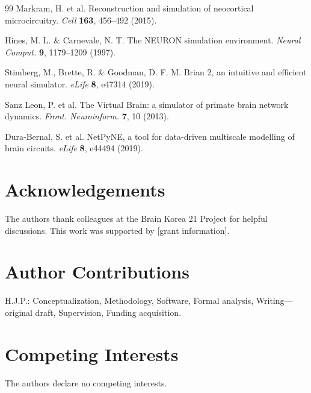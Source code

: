 \documentclass[12pt,a4paper]{article}
\begin{document}
\begin{thebibliography}{99}
Markram, H. et al.
Reconstruction and simulation of neocortical microcircuitry.
\textit{Cell} \textbf{163}, 456--492 (2015).

Hines, M. L. \& Carnevale, N. T.
The NEURON simulation environment.
\textit{Neural Comput.} \textbf{9}, 1179--1209 (1997).

Stimberg, M., Brette, R. \& Goodman, D. F. M.
Brian 2, an intuitive and efficient neural simulator.
\textit{eLife} \textbf{8}, e47314 (2019).

Sanz Leon, P. et al.
The Virtual Brain: a simulator of primate brain network dynamics.
\textit{Front. Neuroinform.} \textbf{7}, 10 (2013).

Dura-Bernal, S. et al.
NetPyNE, a tool for data-driven multiscale modelling of brain circuits.
\textit{eLife} \textbf{8}, e44494 (2019).

\end{thebibliography}

\section*{Acknowledgements}
The authors thank colleagues at the Brain Korea 21 Project for helpful discussions.
This work was supported by [grant information].

\section*{Author Contributions}
H.J.P.: Conceptualization, Methodology, Software, Formal analysis,
Writing---original draft, Supervision, Funding acquisition.

\section*{Competing Interests}
The authors declare no competing interests.
\end{document}

